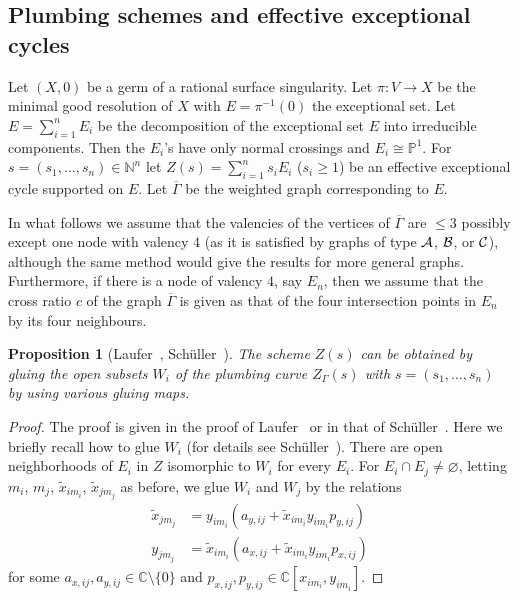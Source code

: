 \documentclass[a4paper, reqno, twoside]{amsart}
\newtheorem{proposition}[theorem]{Proposition}
\theoremstyle{definition}
\numberwithin{equation}{section}
\begin{document}
\subsection{Plumbing schemes and effective exceptional cycles}

Let $(X, 0)$ be a germ of a rational surface singularity. Let
$\pi\colon V \to X$ be the minimal good resolution of $X$ with
$E=\pi^{-1}(0)$ the exceptional set. Let $E= \sum_{i=1}^{n} E_i$ be
the decomposition of the exceptional set $E$ into irreducible
components. Then the $E_i$'s have only normal crossings and $E_i \cong
\mathbb{P}^1$. For $s=(s_1, \dotsc, s_n) \in \mathbb{N}^n$ let
$Z(s)=\sum_{i=1}^{n} s_i E_i$ ($s_i \ge 1$) be an effective
exceptional cycle supported on $E$. Let $\overline{\Gamma}$ be the
weighted graph corresponding to $E$.

In what follows we assume that the valencies of the vertices of
$\overline{\Gamma}$ are $\le 3$ possibly except one node with valency
$4$ (as it is satisfied by graphs of type ${\ensuremath \mathcal{A}}$, ${\ensuremath \mathcal{B}}$, or
${\ensuremath \mathcal{C}}$), although the same method would give the results for  more
general graphs. Furthermore, if there is a node of valency $4$, say
$E_n$, then we assume that the cross ratio $c$ of the graph
$\overline{\Gamma}$ is given as that of the four intersection points
in $E_n$ by its four neighbours.

\begin{proposition}[{Laufer~\cite[Theorem~3.9]{Laufer-1973}, Sch\"uller~\cite[Lemma~3.2]{Schuller-2012}}]\label{proposition:Z-via-gluing-W}
The scheme $Z(s)$ can be obtained by gluing the open subsets $W_i$ of
the plumbing curve $Z_{\Gamma}(s)$ with $s=(s_1,\dotsc,s_n)$ by using
various gluing maps.
\end{proposition}

\begin{proof}
The proof is given in the proof of Laufer~\cite[Theorem~3.9]{Laufer-1973} or
in that of Sch\"uller~\cite[Lemma~3.2]{Schuller-2012}. Here we briefly
recall how to glue $W_i$ (for details see
Sch\"uller~\cite[Lemma~3.2]{Schuller-2012}). There are open neighborhoods of
$E_i$ in $Z$ isomorphic to $W_i$ for every $E_i$. For $E_i \cap E_j \neq \varnothing$, letting $m_i$, $m_j$,
$\widetilde{x}_{im_i}$, $\widetilde{x}_{jm_j}$ as before, we glue $W_i$ and $W_j$ by the
relations
\begin{equation}\label{equation:gluing-map}
\begin{aligned}
\widetilde{x}_{jm_j} &= y_{im_i}(a_{y,ij} + \widetilde{x}_{im_i} y_{im_i} p_{y,ij})\\
y_{jm_j} &= \widetilde{x}_{im_i}(a_{x,ij} + \widetilde{x}_{im_i} y_{im_i} p_{x,ij})
\end{aligned}
\end{equation}
for some $a_{x,ij}, a_{y,ij} \in \mathbb{C} \setminus \{0\}$ and $p_{x,ij}, p_{y,ij} \in \mathbb{C}[x_{im_i}, y_{im_i}]$.
\end{proof}
\end{document}
